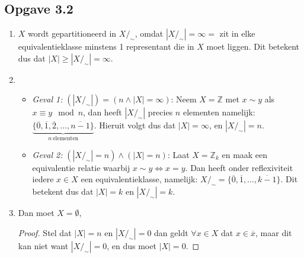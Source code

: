 \documentclass{article}
\newcommand{\Z}{\mathbb{Z}}
\newcommand{\q}{/_\sim}
\newcommand{\ol}[1]{\overline{#1}}
\begin{document}
\subsection*{Opgave 3.2}
\begin{enumerate}[label=\alph*)]
    \item $X$ wordt gepartitioneerd in $X/_\sim$, omdat $|X/_\sim| = \infty =$ zit in elke equivalentieklasse minstens 1 representant die in $X$ moet liggen. Dit betekent dus dat $|X| \geq |X/_\sim| = \infty$.
    \item
          \begin{itemize}
              \item \emph{Geval 1:} $(|X/_\sim|) = (n \wedge |X| = \infty)$:
                    Neem $X=\Z$ met $x \sim y$ als $x \equiv y \mod n$, dan
                    heeft $|X\q|$ precies $n$ elementen namelijk: $\underbrace{\{ \ol{0}, \ol{1}, \ol{2}, \dots ,\ol{n-1} \}}_{n\ \text{elementen}}$.
                    Hieruit volgt dus dat $|X| = \infty$, en $|X\q| = n$.
              \item \emph{Geval 2:} $(|X\q|  = n) \wedge (|X| = n)$:
                    Laat $X = \Z_{k}$ en maak een equivalentie relatie waarbij $x \sim y \Longleftrightarrow x = y$.
                    Dan heeft onder reflexiviteit iedere $x \in X$ een equivalentieklasse,
                    namelijk: $X\q = \{\ol{0}, \ol{1}, \dots , \ol{k-1} \}$.
                    Dit betekent dus dat $|X| = k$ en $|X\q| = k$.
          \end{itemize}
    \item
          Dan moet $X = \emptyset$,
          \begin{proof}
              Stel dat $|X| = n$ en $|X\q| = 0$ dan geldt $\forall x \in
                  X$ dat $x \in \ol{x}$,
              maar dit kan niet want $|X\q| = 0$, en dus
              moet $|X| = 0$.
          \end{proof}
\end{enumerate}
\end{document}
